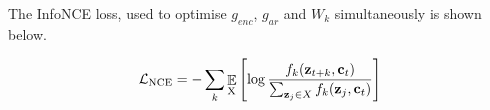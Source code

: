 

	
	The InfoNCE loss, used to optimise $g_{enc}$, $g_{ar}$ and $W_k$ simultaneously is shown below. 

	\begin{equation} %
		\Lnce = - \sum_{k} \expected{\textsubscript{X}} \left[ \log \nceprediction \right] \label{eq:NCE_loss}
	\end{equation}
	
